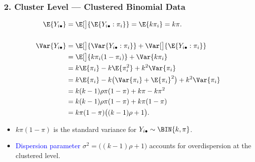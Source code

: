 \documentclass[oneside]{book}\usepackage[]{graphicx}\usepackage[svgnames]{xcolor}
\providecommand\given{} %
\renewcommand\given{\nonscript\:\delimsize\vert\nonscript\:\mathopen{}}%
\renewcommand\given{\nonscript\:\delimsize\vert\nonscript\:\mathopen{}}%
\renewcommand\given{\nonscript\:\delimsize\vert\nonscript\:\mathopen{}}%
\renewcommand\given{\nonscript\:\delimsize\vert\nonscript\:\mathopen{}}%
\renewcommand\given{\nonscript\:\delimsize\vert\nonscript\:\mathopen{}}%
\renewcommand\given{\nonscript\:\delimsize\vert\nonscript\:\mathopen{}}%
\renewcommand\given{\nonscript\:\delimsize\vert\nonscript\:\mathopen{}}%
\renewcommand\given{\nonscript\:\delimsize\vert\nonscript\:\mathopen{}}%
\renewcommand\given{\nonscript\:\delimsize\vert\nonscript\:\mathopen{}}%
\renewcommand\given{\nonscript\:\delimsize\vert\nonscript\:\mathopen{}}%
\renewcommand\given{\nonscript\:\delimsize\vert\nonscript\:\mathopen{}}%
\renewcommand\given{\nonscript\:\delimsize\vert\nonscript\:\mathopen{}}%
\renewcommand\given{:}
\begin{document}
\subsubsection*{2. Cluster Level --- Clustered Binomial Data}
\begin{align*}
    \E{Y_{i\bullet}} & =\E[\big]{\E{Y_{i\bullet}\given \pi_i}}=\E{k\pi_i}=k\pi.                           \\\\
    \Var{Y_{i\bullet}}
                     & =\E[\big]{\Var{Y_{i\bullet}\given \pi_i}}+\Var[\big]{\E{Y_{i\bullet}\given \pi_i}} \\
                     & =\E[\big]{k\pi_i(1-\pi_i)}+\Var{k\pi_i}                                            \\
                     & =k\E{\pi_i}-k\E{\pi_i^2}+k^2\Var{\pi_i}                                            \\
                     & =k\E{\pi_i}-k\bigl(\Var{\pi_i}+\E{\pi_i}^2\bigr)+k^2\Var{\pi_i}                    \\
                     & =k(k-1)\rho\pi(1-\pi)+k\pi-k\pi^2                                                  \\
                     & =k(k-1)\rho\pi(1-\pi)+k\pi(1-\pi)                                                  \\
                     & =k\pi(1-\pi)\bigl((k-1)\rho+1\bigr).
\end{align*}
\begin{itemize}
    \item $ k\pi(1-\pi) $ is the standard variance for $ Y_{i\bullet}\sim \BIN{k,\pi} $.
    \item \textcolor{Blue}{Dispersion parameter} $ \sigma^2=\bigl((k-1)\rho+1\bigr) $ accounts for overdispersion at the clustered level.
\end{itemize}
\end{document}
